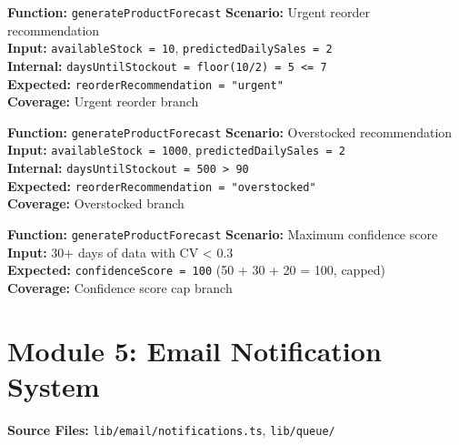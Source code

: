 ﻿\documentclass[12pt,a4paper]{report}
\newcommand{\ptwo}{\textbf{\color{p2orange}P2}}
\newcommand{\pthree}{\textbf{\color{p3blue}P3}}
\begin{document}
\begin{tcolorbox}[testbox,title={FORE-013 \hfill \ptwo}]
\textbf{Function:} \texttt{generateProductForecast} \quad \textbf{Scenario:} Urgent reorder recommendation \\
\textbf{Input:} \texttt{availableStock = 10}, \texttt{predictedDailySales = 2} \\
\textbf{Internal:} \texttt{daysUntilStockout = floor(10/2) = 5 <= 7} \\
\textbf{Expected:} \texttt{reorderRecommendation = "urgent"} \\
\textbf{Coverage:} Urgent reorder branch
\end{tcolorbox}

\begin{tcolorbox}[testbox,title={FORE-014 \hfill \ptwo}]
\textbf{Function:} \texttt{generateProductForecast} \quad \textbf{Scenario:} Overstocked recommendation \\
\textbf{Input:} \texttt{availableStock = 1000}, \texttt{predictedDailySales = 2} \\
\textbf{Internal:} \texttt{daysUntilStockout = 500 > 90} \\
\textbf{Expected:} \texttt{reorderRecommendation = "overstocked"} \\
\textbf{Coverage:} Overstocked branch
\end{tcolorbox}

\begin{tcolorbox}[testbox,title={FORE-015 \hfill \pthree}]
\textbf{Function:} \texttt{generateProductForecast} \quad \textbf{Scenario:} Maximum confidence score \\
\textbf{Input:} 30+ days of data with CV < 0.3 \\
\textbf{Expected:} \texttt{confidenceScore = 100} (50 + 30 + 20 = 100, capped) \\
\textbf{Coverage:} Confidence score cap branch
\end{tcolorbox}

\section{Module 5: Email Notification System}

\textbf{Source Files:} \texttt{lib/email/notifications.ts}, \texttt{lib/queue/}
\end{document}
